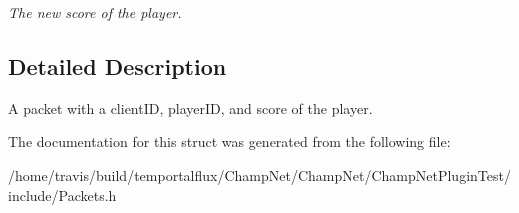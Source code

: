 \begin{DoxyCompactItemize}
\begin{DoxyCompactList}\small\item\em The new score of the player. \end{DoxyCompactList}\end{DoxyCompactItemize}


\subsection{Detailed Description}
A packet with a client\-I\-D, player\-I\-D, and score of the player. 

The documentation for this struct was generated from the following file\-:\begin{DoxyCompactItemize}
\item 
/home/travis/build/temportalflux/\-Champ\-Net/\-Champ\-Net/\-Champ\-Net\-Plugin\-Test/include/Packets.\-h\end{DoxyCompactItemize}
